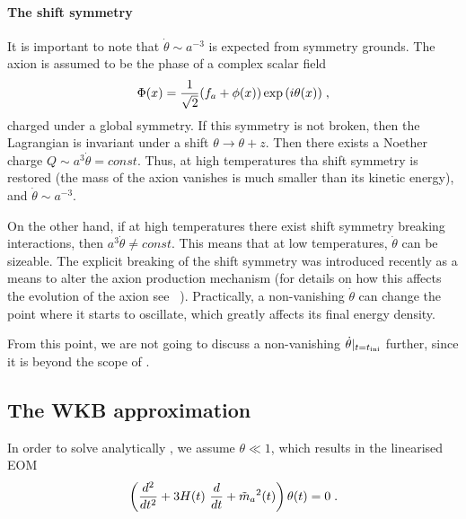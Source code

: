 \documentclass[11pt,a4paper]{article}
\begin{document}
\paragraph{The shift symmetry}
It is important to note that  $\dot \theta \sim a^{-3}$ is expected from symmetry grounds. The axion is assumed to be the phase of a complex scalar field
%
\begin{equation}
	\Phi(x) = \dfrac{1}{\sqrt{2}}(f_{a}{} + \phi(x)) \exp{(i \theta(x))} \;, 
\end{equation}
%
charged under a global symmetry. If this symmetry is not broken, then the Lagrangian is invariant under a shift $\theta \to \theta + z$. Then there exists a Noether charge $Q  \sim a^3 \dot \theta = const.$ Thus, at high temperatures tha shift symmetry is restored (\ie the mass of the axion vanishes is much smaller than its kinetic energy), and $\dot \theta \sim a^{-3}$.

On the other hand, if at high temperatures there exist shift symmetry  breaking interactions, then $ a^3 \dot \theta \neq const.$ This means that at low temperatures, $\dot \theta$ can be sizeable. The explicit breaking of the shift symmetry was introduced recently as a means to alter the axion production mechanism  (for details on how this affects the evolution of the axion see \eg  ~\cite{Co:2019jts,Chang:2019tvx}). Practically, a non-vanishing $\dot \theta$ can change the point where it starts to oscillate, which greatly affects its final energy density. 

From this point, we are not going to discuss a non-vanishing $\dot \theta |_{t=t_{\rm ini}{}}$  further, since it is beyond the scope of \mimes.

 
\subsection{The WKB approximation}
%
In order to solve analytically , we assume $\theta \ll 1$, which results in the linearised EOM
%
\begin{equation}
	\left( \dfrac{d^2}{d t^2} + 3 H(t) \ \dfrac{d}{d t} + \tilde m_{a}{}^2(t)  \right) \theta(t) = 0 \; .
	\label{eq:linear_eom}
\end{equation}
\end{document}
